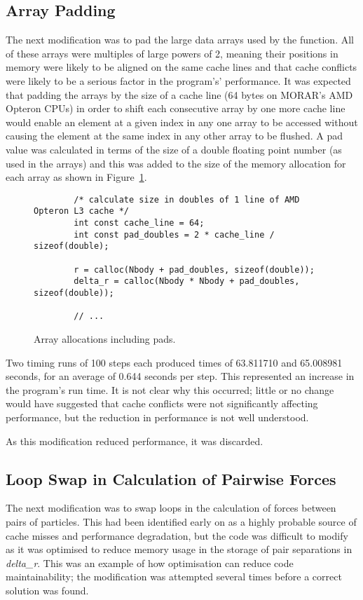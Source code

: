 \documentclass[11pt, oneside]{article}   %
\begin{document}
\subsection{Array Padding}
The next modification was to pad the large data arrays used by the function.
All of these arrays were multiples of large powers of 2, meaning their positions in memory were likely to be aligned on the same cache lines and that cache conflicts were likely to be a serious factor in the program's' performance.
It was expected that padding the arrays by the size of a cache line (64 bytes on MORAR's AMD Opteron CPUs) in order to shift each consecutive array by one more cache line would enable an element at a given index in any one array to be accessed without causing the element at the same index in any other array to be flushed.
A pad value was calculated in terms of the size of a double floating point number (as used in the arrays) and this was added to the size of the memory allocation for each array as shown in Figure~\ref{figure:Pad}.

\begin{figure}
	\begin{lstlisting}
		/* calculate size in doubles of 1 line of AMD Opteron L3 cache */
		int const cache_line = 64;
		int const pad_doubles = 2 * cache_line / sizeof(double);

		r = calloc(Nbody + pad_doubles, sizeof(double));
		delta_r = calloc(Nbody * Nbody + pad_doubles, sizeof(double));

		// ...
	\end{lstlisting}
	\caption{Array allocations including pads.}
	\label{figure:Pad}
\end{figure}

Two timing runs of 100 steps each produced times of 63.811710 and 65.008981 seconds, for an average of 0.644 seconds per step.
This represented an increase in the program's run time.
It is not clear why this occurred; little or no change would have suggested that cache conflicts were not significantly affecting performance, but the reduction in performance is not well understood.

As this modification reduced performance, it was discarded.

\subsection{Loop Swap in Calculation of Pairwise Forces}
The next modification was to swap loops in the calculation of forces between pairs of particles. 
This had been identified early on as a highly probable source of cache misses and performance degradation, but the code was difficult to modify as it was optimised to reduce memory usage in the storage of pair separations in {\em delta\_r}.
This was an example of how optimisation can reduce code maintainability; the modification was attempted several times before a correct solution was found.
\end{document}
